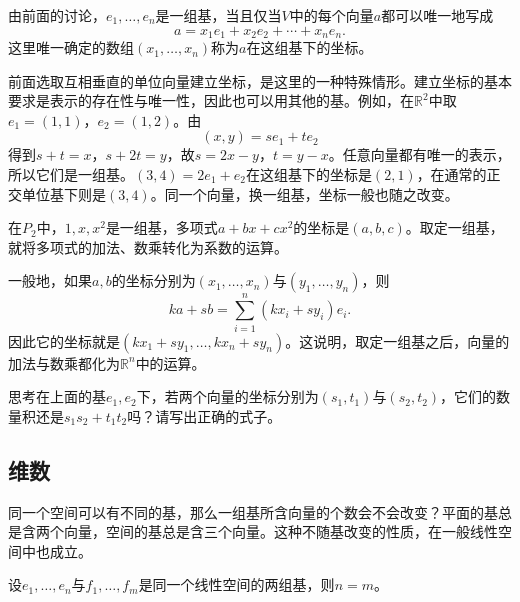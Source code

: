 由前面的讨论，\(e_{1} , \ldots , e_{n}\)是一组基，当且仅当\(V\)中的每个向量\(a\)都可以唯一地写成
\begin{equation}
    a = x_{1} e_{1} + x_{2} e_{2} + \cdots + x_{n} e_{n} .
\end{equation}
这里唯一确定的数组\(\left( x_{1} , \ldots , x_{n} \right)\)称为\(a\)在这组基下的坐标。

前面选取互相垂直的单位向量建立坐标，是这里的一种特殊情形。建立坐标的基本要求是表示的存在性与唯一性，因此也可以用其他的基。例如，在\(\mathbb{R}^{2}\)中取
\(e_{1} = \left( 1 , 1 \right)\)，\(e_{2} = \left( 1 , 2 \right)\)。由
\begin{equation}
    \left( x , y \right) = s e_{1} + t e_{2}
\end{equation}
得到\(s + t = x\)，\(s + 2 t = y\)，故\(s = 2 x - y\)，\(t = y - x\)。任意向量都有唯一的表示，所以它们是一组基。\(\left( 3 , 4 \right) = 2 e_{1} + e_{2}\)在这组基下的坐标是\(\left( 2 , 1 \right)\)，在通常的正交单位基下则是\(\left( 3 , 4 \right)\)。同一个向量，换一组基，坐标一般也随之改变。

在\(P_{2}\)中，\(1 , x , x^{2}\)是一组基，多项式\(a + b x + c x^{2}\)的坐标是\(\left( a , b , c \right)\)。取定一组基，就将多项式的加法、数乘转化为系数的运算。

一般地，如果\(a , b\)的坐标分别为\(\left( x_{1} , \ldots , x_{n} \right)\)与\(\left( y_{1} , \ldots , y_{n} \right)\)，则
\begin{equation}
    k a + s b = \sum_{i = 1}^{n} \left( k x_{i} + s y_{i} \right) e_{i} .
\end{equation}
因此它的坐标就是\(\left( k x_{1} + s y_{1} , \ldots , k x_{n} + s y_{n} \right)\)。这说明，取定一组基之后，向量的加法与数乘都化为\(\mathbb{R}^{n}\)中的运算。

{\kaiti{}思考\quad 在上面的基\(e_{1} , e_{2}\)下，若两个向量的坐标分别为\(\left( s_{1} , t_{1} \right)\)与\(\left( s_{2} , t_{2} \right)\)，它们的数量积还是\(s_{1} s_{2} + t_{1} t_{2}\)吗？请写出正确的式子。}

\subsection{维数}
同一个空间可以有不同的基，那么一组基所含向量的个数会不会改变？平面的基总是含两个向量，空间的基总是含三个向量。这种不随基改变的性质，在一般线性空间中也成立。

\begin{theorem}\label{thm:dim}
设\(e_{1} , \ldots , e_{n}\)与\(f_{1} , \ldots , f_{m}\)是同一个线性空间的两组基，则\(n = m\)。
\end{theorem}

